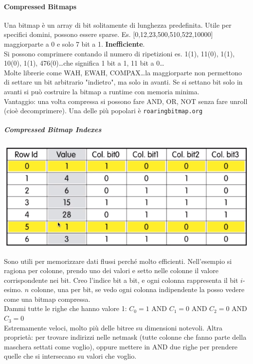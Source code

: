 \documentclass[10pt]{book}
\begin{document}
\paragraph{Compressed Bitmaps} Una bitmap è un array di bit solitamente di lunghezza predefinita. Utile per specifici domini, possono essere sparse. Es. [0,12,23,500,510,522,10000] maggiorparte a 0 e solo 7 bit a 1. \textbf{Inefficiente}.\\
Si possono comprimere contando il numero di ripetizioni es. 1(1), 11(0), 1(1), 10(0), 1(1), 476(0)\ldots che significa 1 bit a 1, 11 bit a 0\ldots\\
Molte librerie come WAH, EWAH, COMPAX\ldots la maggiorparte non permettono di settare un bit arbitrario "indietro", ma solo in avanti. Se si settano bit solo in avanti si può costruire la bitmap a runtime con memoria minima.\\
Vantaggio: una volta compressa si possono fare AND, OR, NOT senza fare unroll (cioè decomprimere). Una delle più popolari è \texttt{roaringbitmap.org}
\subparagraph{Compressed Bitmap Indexes} 
\begin{center}
	\includegraphics[scale=0.7]{comprbitmapindex.png}
\end{center}
Sono utili per memorizzare dati flussi perché molto efficienti. Nell'esempio si ragiona per colonne, prendo uno dei valori e setto nelle colonne il valore corrispondente nei bit. Creo l'indice bit a bit, e ogni colonna rappresenta il bit $i$-esimo. $n$ colonne, una per bit, se vedo ogni colonna indipendente la posso vedere come una bitmap compressa.\\
Dammi tutte le righe che hanno valore 1: $C_0 = 1$ AND $C_1 = 0$ AND $C_2 = 0$ AND $C_3 = 0$\\
Estremamente veloci, molto più delle bitree su dimensioni notevoli. Altra proprietà: per trovare indirizzi nelle netmask (tutte colonne che fanno parte della maschera settati come voglio), oppure mettere in AND due righe per prendere quelle che si intersecano su valori che voglio.
\end{document}

